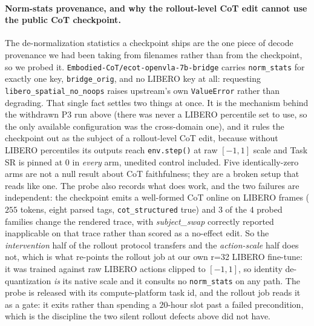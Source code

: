 \documentclass{article}
\begin{document}
\paragraph{Norm-stats provenance, and why the rollout-level CoT edit cannot use the public CoT checkpoint.} The de-normalization statistics a checkpoint ships are the one piece of decode provenance we had been taking from filenames rather than from the checkpoint, so we probed it. \texttt{Embodied-CoT/ecot-openvla-7b-bridge} carries \texttt{norm\_stats} for exactly one key, \texttt{bridge\_orig}, and no LIBERO key at all: requesting \texttt{libero\_spatial\_no\_noops} raises upstream's own \texttt{ValueError} rather than degrading. That single fact settles two things at once. It is the mechanism behind the withdrawn P3 run above (there was never a LIBERO percentile set to use, so the only available configuration was the cross-domain one), and it rules the checkpoint out as the subject of a rollout-level CoT edit, because without LIBERO percentiles its outputs reach \texttt{env.step()} at raw $[-1,1]$ scale and Task SR is pinned at $0$ in \emph{every} arm, unedited control included. Five identically-zero arms are not a null result about CoT faithfulness; they are a broken setup that reads like one. The probe also records what does work, and the two failures are independent: the checkpoint emits a well-formed CoT online on LIBERO frames ($255$ tokens, eight parsed tags, \texttt{cot\_structured} true) and $3$ of the $4$ probed families change the rendered trace, with \emph{subject\_swap} correctly reported inapplicable on that trace rather than scored as a no-effect edit. So the \emph{intervention} half of the rollout protocol transfers and the \emph{action-scale} half does not, which is what re-points the rollout job at our own \mbox{r=32} LIBERO fine-tune: it was trained against raw LIBERO actions clipped to $[-1,1]$, so identity de-quantization \emph{is} its native scale and it consults no \texttt{norm\_stats} on any path. The probe is released with its compute-platform task id, and the rollout job reads it as a gate: it exits rather than spending a $20$-hour slot past a failed precondition, which is the discipline the two silent rollout defects above did not have.
\end{document}
